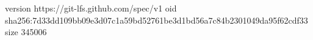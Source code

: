 version https://git-lfs.github.com/spec/v1
oid sha256:7d33dd109bb09e3d07c1a59bd52761be3d1bd56a7c84b2301049da95f62cdf33
size 345006
